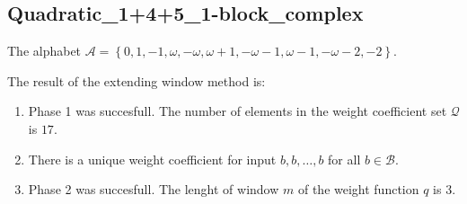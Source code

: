 \subsection{ Quadratic\_1+4+5\_1-block\_complex }

\label{subsec:Quadratic+1+4+51-blockcomplex}

The alphabet $\mathcal{A} =\left\{0, 1, -1, \omega, -\omega, \omega + 1, -\omega - 1, \omega - 1, -\omega - 2, -2\right\}$.

\noindent The result of the extending window method is:
\begin{enumerate}
    \item Phase 1 was succesfull.
The number of elements in the weight coefficient set $\mathcal{Q}$ is $17$.

    \item There is a unique weight coefficient for input $b,b,\dots,b$ for all $b\in\mathcal{B}$.

    \item Phase 2 was succesfull.
The lenght of window $m$ of the weight function $q$ is 3.
\end{enumerate}
